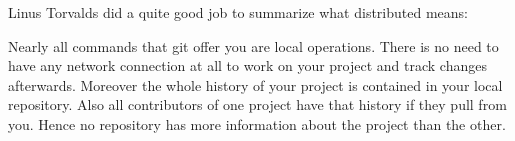 Linus Torvalds did a quite good job to summarize what distributed means:

 \cite{googletechtalk2007}

Nearly all commands that git offer you are local operations. There is no need to
have any network connection at all to work on your project and track changes
afterwards. Moreover the whole history of your project is contained in your
local repository. Also all contributors of one project have that history if
they pull from you. Hence no repository has more information about the project
than the other.

